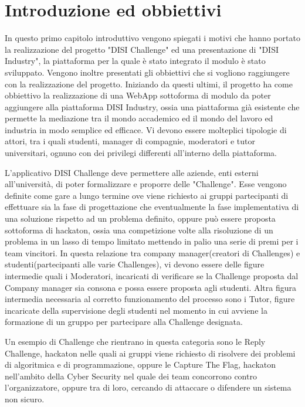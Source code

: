 \chapter{Introduzione ed obbiettivi }
\label{cha:intro}
In questo primo capitolo introduttivo vengono spiegati i motivi che hanno portato la realizzazione del progetto "DISI Challenge" ed una presentazione di "DISI Industry", la piattaforma per la quale è stato integrato il modulo è stato sviluppato. Vengono inoltre presentati gli obbiettivi che si vogliono raggiungere con la realizzazione del progetto.
Iniziando da questi ultimi, il progetto ha come obbiettivo la realizzazione di una WebApp sottoforma di modulo da poter aggiungere alla piattaforma DISI Industry, ossia una piattaforma già esistente che permette la mediazione tra il mondo accademico ed il mondo del lavoro ed industria in modo semplice ed efficace. Vi devono essere molteplici tipologie di attori, tra i quali studenti, manager di compagnie, moderatori e tutor universitari, ognuno con dei privilegi differenti all'interno della piattaforma. 


L'applicativo DISI Challenge deve permettere alle aziende, enti esterni all'università, di poter formalizzare e proporre delle "Challenge". Esse vengono definite come gare a lungo termine ove viene richiesto ai gruppi partecipanti di effettuare sia la fase di progettazione che eventualmente la fase implementativa di una soluzione rispetto ad un problema definito, oppure può essere proposta sottoforma di hackaton, ossia una competizione volte alla risoluzione di un problema in un lasso di tempo limitato mettendo in palio una serie di premi per i team vincitori. In questa relazione tra company manager(creatori di Challenges) e studenti(partecipanti alle varie Challenges), vi devono essere delle figure intermedie quali i Moderatori, incaricati di verificare se la Challenge proposta dal Company manager sia consona e possa essere proposta agli studenti. Altra figura intermedia necessaria al corretto funzionamento del processo sono i Tutor, figure incaricate della supervisione degli studenti nel momento in cui avviene la formazione di un gruppo per partecipare alla Challenge designata.

Un esempio di Challenge che rientrano in questa categoria sono le Reply Challenge, hackaton nelle quali ai gruppi viene richiesto di risolvere dei problemi di algoritmica e di programmazione, oppure le Capture The Flag, hackaton nell'ambito della Cyber Security nel quale dei team concorrono contro l'organizzatore, oppure tra di loro, cercando di attaccare o difendere un sistema non sicuro.

